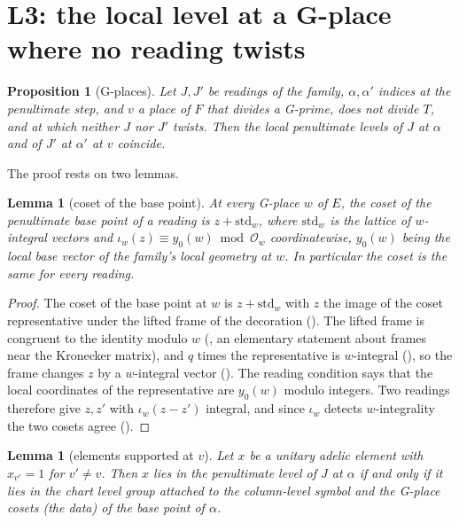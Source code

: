 \documentclass[11pt]{article}
\newcommand{\Ok}{\mathcal O}
\newtheorem{proposition}[theorem]{Proposition}
\newtheorem{lemma}[theorem]{Lemma}
\theoremstyle{definition}
\theoremstyle{remark}
\begin{document}
\section{L3: the local level at a G-place where no reading twists}\label{sec:L3}

\begin{proposition}[G-places]\label{prop:L3}
Let $J,J'$ be readings of the family, $\alpha,\alpha'$ indices at the penultimate step, and $v$ a place of $F$ that divides a G-prime, does not divide $T$, and at which neither $J$ nor $J'$ twists. Then the local penultimate levels of $J$ at $\alpha$ and of $J'$ at $\alpha'$ at $v$ coincide.
\end{proposition}

The proof rests on two lemmas.

\begin{lemma}[coset of the base point]\label{lem:coset}
At every G-place $w$ of $E$, the coset of the penultimate base point of a reading is $z+\mathrm{std}_w$, where $\mathrm{std}_w$ is the lattice of $w$-integral vectors and $\iota_w(z)\equiv y_0(w)\bmod\Ok_w$ coordinatewise, $y_0(w)$ being the local base vector of the family's local geometry at $w$. In particular the coset is the same for every reading.
\end{lemma}

\begin{proof}
The coset of the base point at $w$ is $z+\mathrm{std}_w$ with $z$ the image of the coset representative under the lifted frame of the decoration (). The lifted frame is congruent to the identity modulo $w$ (, an elementary statement about frames near the Kronecker matrix), and $q$ times the representative is $w$-integral (), so the frame changes $z$ by a $w$-integral vector (). The reading condition  says that the local coordinates of the representative are $y_0(w)$ modulo integers. Two readings therefore give $z,z'$ with $\iota_w(z-z')$ integral, and since $\iota_w$ detects $w$-integrality the two cosets agree ().
\end{proof}

\begin{lemma}[elements supported at $v$]\label{lem:supp}
Let $x$ be a unitary adelic element with $x_{v'}=1$ for $v'\ne v$. Then $x$ lies in the penultimate level of $J$ at $\alpha$ if and only if it lies in the chart level group attached to the column-level symbol and the G-place cosets (the  data) of the base point of $\alpha$.
\end{lemma}
\end{document}
